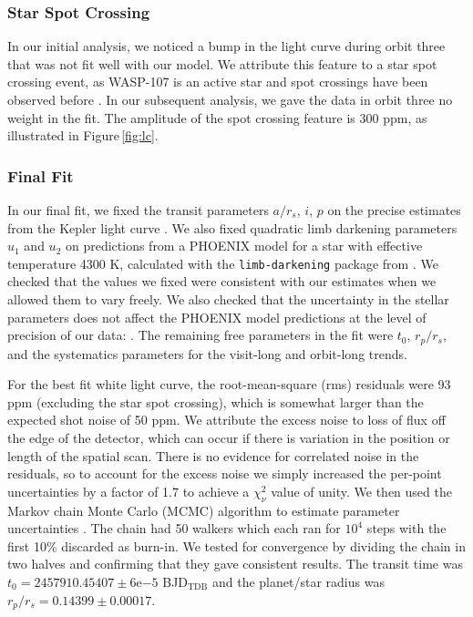 \documentclass[twocolumn, trackchanges]{aastex61}
\begin{document}
\subsubsection{Star Spot Crossing}
In our initial analysis, we noticed a bump in the light curve during orbit three that was not fit well with our model. We attribute this feature to a star spot crossing event, as WASP-107 is an active star and spot crossings have been observed before \citep{dai17, mocnik17}. In our subsequent analysis, we gave the data in orbit three no weight in the fit. The amplitude of the spot crossing feature is 300 ppm, as illustrated in Figure\,\ref{fig:lc}.

\subsubsection{Final Fit}
In our final fit, we fixed the transit parameters $a/r_s$, $i$, $p$ on the precise estimates from the Kepler light curve \citep{dai17}.  We also fixed quadratic limb darkening parameters $u_1$ and $u_2$ on predictions from a PHOENIX model for a star with effective temperature 4300 K, calculated with the \texttt{limb-darkening} package from \cite{espinoza15}.  We checked that the values we fixed were consistent with our estimates when we allowed them to vary freely.  We also checked that the uncertainty in the stellar parameters does not affect the PHOENIX model predictions at the level of precision of our data: .  The remaining free parameters in the fit were $t_0$, $r_p/r_s$, and the systematics parameters for the visit-long and orbit-long trends.

For the best fit white light curve, the root-mean-square (rms) residuals were 93 ppm (excluding the star spot crossing), which is somewhat larger than the expected shot noise of 50 ppm. We attribute the excess noise to loss of flux off the edge of the detector, which can occur if there is variation in the position or length of the spatial scan. There is no evidence for correlated noise in the residuals, so to account for the excess noise we simply increased the per-point uncertainties by a factor of 1.7 to achieve a $\chi^2_\nu$ value of unity.  We then used the Markov chain Monte Carlo (MCMC) algorithm to estimate parameter uncertainties \citep{foremanmackey13}.  The chain had 50 walkers which each ran for $10^4$ steps with the first 10\% discarded as burn-in. We tested for convergence by dividing the chain in two halves and confirming that they gave consistent results. The transit time was $t_0 = 2457910.45407\pm6\mathrm{e}{-5}$ BJD$_\mathrm{TDB}$ and the planet/star radius was $r_p/r_s = 0.14399\pm0.00017$. 
\end{document}
